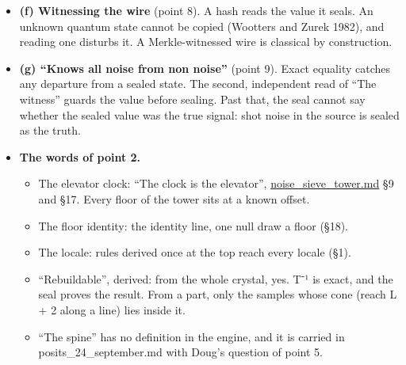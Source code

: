 \begin{itemize}
\begin{itemize}
\item An exact pair is an exact complex amplitude when the pair is (re, im), as Gaussian rationals. A (magnitude, phase) pair is exact only with the phase an index k of a root of unity, ζ\_\allowbreak{}N\textasciicircum{}k in ℤ[ζ\_\allowbreak{}N].
\item The knf as phase is untested, and it is carried in posits\_\allowbreak{}24\_\allowbreak{}september.md.
\item An exact classical register holds a qubit's state vector exactly. \texttt{ask\_\allowbreak{}state} (M21) carries a qubit exactly now. n qubits cost 2ⁿ amplitudes, and exact classical registers give no Bell violation between separated parts. “Classic qubit” fits the reading of an exact simulation with no rounding.
\end{itemize}
\item \textbf{(f) Witnessing the wire} (point 8). A hash reads the value it seals. An unknown quantum state cannot be copied (Wootters and Zurek 1982), and reading one disturbs it. A Merkle-witnessed wire is classical by construction.
\item \textbf{(g) “Knows all noise from non noise”} (point 9). Exact equality catches any departure from a sealed state. The second, independent read of “The witness” guards the value before sealing. Past that, the seal cannot say whether the sealed value was the true signal: shot noise in the source is sealed as the truth.
\item \textbf{The words of point 2.}

\begin{itemize}
\item The elevator clock: “The clock is the elevator”, \hyperref[chap:noise-sieve-tower]{noise\_\allowbreak{}sieve\_\allowbreak{}tower.md} §9 and §17. Every floor of the tower sits at a known offset.
\item The floor identity: the identity line, one null draw a floor (§18).
\item The locale: rules derived once at the top reach every locale (§1).
\item “Rebuildable”, derived: from the whole crystal, yes. T⁻¹ is exact, and the seal proves the result. From a part, only the samples whose cone (reach L + 2 along a line) lies inside it.
\item “The spine” has no definition in the engine, and it is carried in posits\_\allowbreak{}24\_\allowbreak{}september.md with Doug's question of point 5.
\end{itemize}
\end{itemize}

